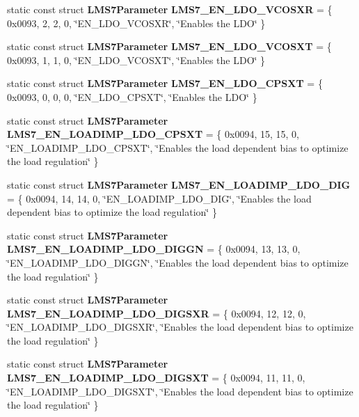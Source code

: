 \begin{DoxyCompactItemize}
\item 
static const struct {\bf L\+M\+S7\+Parameter} {\bf L\+M\+S7\+\_\+\+E\+N\+\_\+\+L\+D\+O\+\_\+\+V\+C\+O\+S\+XR} = \{ 0x0093, 2, 2, 0, \char`\"{}\+E\+N\+\_\+\+L\+D\+O\+\_\+\+V\+C\+O\+S\+X\+R\char`\"{}, \char`\"{}\+Enables the L\+D\+O\char`\"{} \}
\item 
static const struct {\bf L\+M\+S7\+Parameter} {\bf L\+M\+S7\+\_\+\+E\+N\+\_\+\+L\+D\+O\+\_\+\+V\+C\+O\+S\+XT} = \{ 0x0093, 1, 1, 0, \char`\"{}\+E\+N\+\_\+\+L\+D\+O\+\_\+\+V\+C\+O\+S\+X\+T\char`\"{}, \char`\"{}\+Enables the L\+D\+O\char`\"{} \}
\item 
static const struct {\bf L\+M\+S7\+Parameter} {\bf L\+M\+S7\+\_\+\+E\+N\+\_\+\+L\+D\+O\+\_\+\+C\+P\+S\+XT} = \{ 0x0093, 0, 0, 0, \char`\"{}\+E\+N\+\_\+\+L\+D\+O\+\_\+\+C\+P\+S\+X\+T\char`\"{}, \char`\"{}\+Enables the L\+D\+O\char`\"{} \}
\item 
static const struct {\bf L\+M\+S7\+Parameter} {\bf L\+M\+S7\+\_\+\+E\+N\+\_\+\+L\+O\+A\+D\+I\+M\+P\+\_\+\+L\+D\+O\+\_\+\+C\+P\+S\+XT} = \{ 0x0094, 15, 15, 0, \char`\"{}\+E\+N\+\_\+\+L\+O\+A\+D\+I\+M\+P\+\_\+\+L\+D\+O\+\_\+\+C\+P\+S\+X\+T\char`\"{}, \char`\"{}\+Enables the load dependent bias to optimize the load regulation\char`\"{} \}
\item 
static const struct {\bf L\+M\+S7\+Parameter} {\bf L\+M\+S7\+\_\+\+E\+N\+\_\+\+L\+O\+A\+D\+I\+M\+P\+\_\+\+L\+D\+O\+\_\+\+D\+IG} = \{ 0x0094, 14, 14, 0, \char`\"{}\+E\+N\+\_\+\+L\+O\+A\+D\+I\+M\+P\+\_\+\+L\+D\+O\+\_\+\+D\+I\+G\char`\"{}, \char`\"{}\+Enables the load dependent bias to optimize the load regulation\char`\"{} \}
\item 
static const struct {\bf L\+M\+S7\+Parameter} {\bf L\+M\+S7\+\_\+\+E\+N\+\_\+\+L\+O\+A\+D\+I\+M\+P\+\_\+\+L\+D\+O\+\_\+\+D\+I\+G\+GN} = \{ 0x0094, 13, 13, 0, \char`\"{}\+E\+N\+\_\+\+L\+O\+A\+D\+I\+M\+P\+\_\+\+L\+D\+O\+\_\+\+D\+I\+G\+G\+N\char`\"{}, \char`\"{}\+Enables the load dependent bias to optimize the load regulation\char`\"{} \}
\item 
static const struct {\bf L\+M\+S7\+Parameter} {\bf L\+M\+S7\+\_\+\+E\+N\+\_\+\+L\+O\+A\+D\+I\+M\+P\+\_\+\+L\+D\+O\+\_\+\+D\+I\+G\+S\+XR} = \{ 0x0094, 12, 12, 0, \char`\"{}\+E\+N\+\_\+\+L\+O\+A\+D\+I\+M\+P\+\_\+\+L\+D\+O\+\_\+\+D\+I\+G\+S\+X\+R\char`\"{}, \char`\"{}\+Enables the load dependent bias to optimize the load regulation\char`\"{} \}
\item 
static const struct {\bf L\+M\+S7\+Parameter} {\bf L\+M\+S7\+\_\+\+E\+N\+\_\+\+L\+O\+A\+D\+I\+M\+P\+\_\+\+L\+D\+O\+\_\+\+D\+I\+G\+S\+XT} = \{ 0x0094, 11, 11, 0, \char`\"{}\+E\+N\+\_\+\+L\+O\+A\+D\+I\+M\+P\+\_\+\+L\+D\+O\+\_\+\+D\+I\+G\+S\+X\+T\char`\"{}, \char`\"{}\+Enables the load dependent bias to optimize the load regulation\char`\"{} \}

\end{DoxyCompactItemize}
